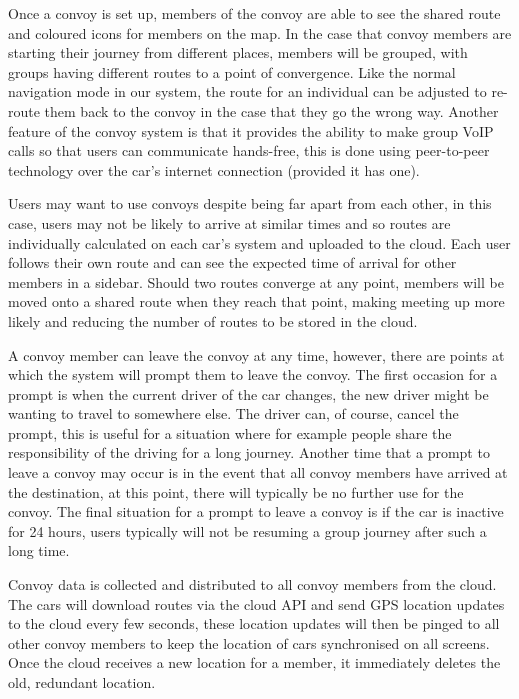 \documentclass{article}
\begin{document}
Once a convoy is set up, members of the convoy are able to see the shared route and coloured icons for members on the map. In the case that convoy members are starting their journey from different places, members will be grouped, with groups having different routes to a point of convergence. Like the normal navigation mode in our system, the route for an individual can be adjusted to re-route them back to the convoy in the case that they go the wrong way. Another feature of the convoy system is that it provides the ability to make group VoIP calls so that users can communicate hands-free, this is done using peer-to-peer technology over the car's internet connection (provided it has one).

Users may want to use convoys despite being far apart from each other, in this case, users may not be likely to arrive at similar times and so routes are individually calculated on each car's system and uploaded to the cloud. Each user follows their own route and can see the expected time of arrival for other members in a sidebar. Should two routes converge at any point, members will be moved onto a shared route when they reach that point, making meeting up more likely and reducing the number of routes to be stored in the cloud.

A convoy member can leave the convoy at any time, however, there are points at which the system will prompt them to leave the convoy. The first occasion for a prompt is when the current driver of the car changes, the new driver might be wanting to travel to somewhere else. The driver can, of course, cancel the prompt, this is useful for a situation where for example people share the responsibility of the driving for a long journey. Another time that a prompt to leave a convoy may occur is in the event that all convoy members have arrived at the destination, at this point, there will typically be no further use for the convoy. The final situation for a prompt to leave a convoy is if the car is inactive for 24 hours, users typically will not be resuming a group journey after such a long time.

Convoy data is collected and distributed to all convoy members from the cloud. The cars will download routes via the cloud API and send GPS location updates to the cloud every few seconds, these location updates will then be pinged to all other convoy members to keep the location of cars synchronised on all screens. Once the cloud receives a new location for a member, it immediately deletes the old, redundant location.
\end{document}
